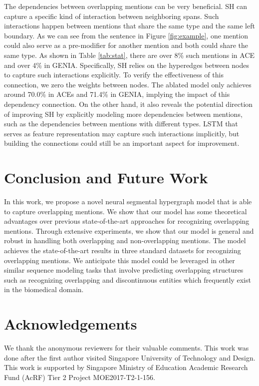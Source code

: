 \documentclass[11pt,a4paper]{article}
\theoremstyle{theorem}
\begin{document}
The dependencies between overlapping mentions can be very beneficial.
SH can capture a specific kind of interaction between neighboring spans.
Such interactions happen between mentions that share the same type and the same left boundary. 
As we can see from the sentence in Figure \ref{fig:example}, one mention could also serve as a pre-modifier for another mention and both could share the same type.
As shown in Table \ref{tab:stat}, there are over 8\% such mentions in ACE  and over 4\% in GENIA. 
Specifically, {\color{black} SH relies on the hyperedges between  nodes to capture such interactions explicitly.}
To verify the effectiveness of {\color{black}this connection}, we zero the weights between  nodes.
The ablated model only achieves around 70.0\% in ACEs and 71.4\% in GENIA, implying the impact of this {\color{black}dependency connection}.
On the other hand, it also reveals the potential direction of improving SH by explicitly modeling more dependencies between mentions, such as the dependencies between mentions with different types.
LSTM that serves as feature representation may capture such interactions implicitly, but building the connections could still be an important aspect for improvement.







\section{Conclusion and Future Work}


In this work, we propose a novel neural segmental hypergraph model that is able to capture overlapping mentions.
We show that our model has some theoretical advantages over previous state-of-the-art approaches for recognizing overlapping mentions.
Through extensive experiments,  we show that our model is general and robust in handling both overlapping and non-overlapping mentions. 
The model achieves the state-of-the-art results in three standard datasets for recognizing overlapping mentions.
We anticipate this model could be leveraged in other similar sequence modeling tasks that involve predicting overlapping structures such as recognizing overlapping and discontinuous entities \cite{muis2016learning} which frequently exist in the biomedical domain.


\section*{Acknowledgements}

We thank the anonymous reviewers for their valuable comments. 
This work was done after the first author visited Singapore University of Technology and Design.
This work is supported by Singapore Ministry of Education Academic Research Fund (AcRF) Tier 2 Project MOE2017-T2-1-156.



\end{document}
